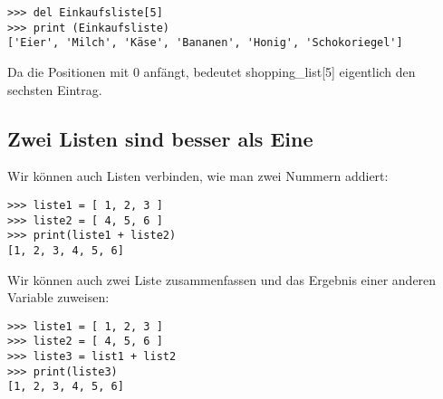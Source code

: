 \begin{Verbatim}[frame=single]
>>> del Einkaufsliste[5]
>>> print (Einkaufsliste)
['Eier', 'Milch', 'Käse', 'Bananen', 'Honig', 'Schokoriegel']
\end{Verbatim}

Da die Positionen mit 0 anfängt, bedeutet shopping\_list[5] eigentlich den sechsten Eintrag.

\subsection*{\color{BrickRed}Zwei Listen sind besser als Eine}

Wir können auch Listen verbinden, wie man zwei Nummern addiert:

\begin{Verbatim}[frame=single]
>>> liste1 = [ 1, 2, 3 ]
>>> liste2 = [ 4, 5, 6 ]
>>> print(liste1 + liste2)
[1, 2, 3, 4, 5, 6]
\end{Verbatim}

\noindent
Wir können auch zwei Liste zusammenfassen und das Ergebnis einer anderen Variable zuweisen:

\begin{Verbatim}[frame=single]
>>> liste1 = [ 1, 2, 3 ]
>>> liste2 = [ 4, 5, 6 ]
>>> liste3 = list1 + list2
>>> print(liste3)
[1, 2, 3, 4, 5, 6]
\end{Verbatim}

